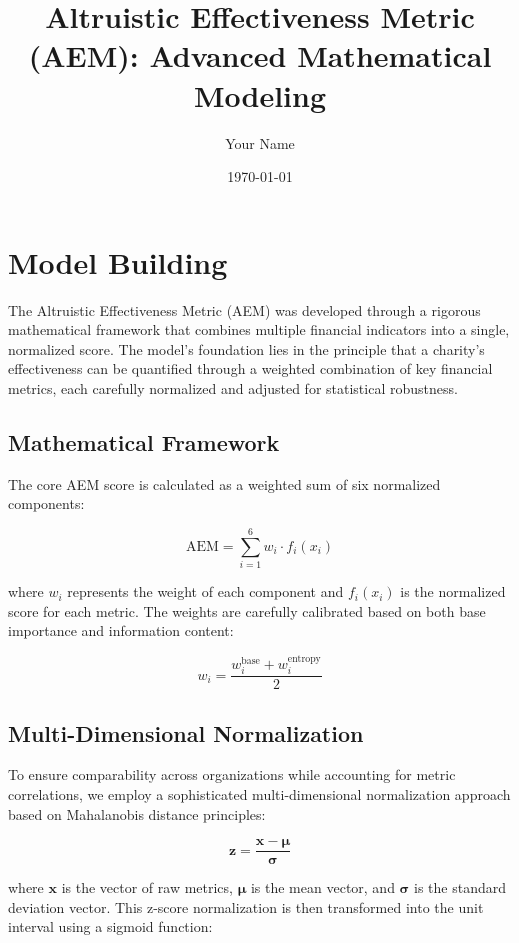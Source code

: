 \documentclass[12pt]{article}
\title{Altruistic Effectiveness Metric (AEM): Advanced Mathematical Modeling}
\author{Your Name}
\date{\today}
\begin{document}
\maketitle

\section{Model Building}

The Altruistic Effectiveness Metric (AEM) was developed through a rigorous mathematical framework that combines multiple financial indicators into a single, normalized score. The model's foundation lies in the principle that a charity's effectiveness can be quantified through a weighted combination of key financial metrics, each carefully normalized and adjusted for statistical robustness.

\subsection{Mathematical Framework}

The core AEM score is calculated as a weighted sum of six normalized components:

\begin{equation}
    \text{AEM} = \sum_{i=1}^{6} w_i \cdot f_i(x_i)
\end{equation}

where $w_i$ represents the weight of each component and $f_i(x_i)$ is the normalized score for each metric. The weights are carefully calibrated based on both base importance and information content:

\begin{equation}
    w_i = \frac{w_i^{\text{base}} + w_i^{\text{entropy}}}{2}
\end{equation}

\subsection{Multi-Dimensional Normalization}

To ensure comparability across organizations while accounting for metric correlations, we employ a sophisticated multi-dimensional normalization approach based on Mahalanobis distance principles:

\begin{equation}
    \mathbf{z} = \frac{\mathbf{x} - \mathbf{\mu}}{\mathbf{\sigma}}
\end{equation}

where $\mathbf{x}$ is the vector of raw metrics, $\mathbf{\mu}$ is the mean vector, and $\mathbf{\sigma}$ is the standard deviation vector. This z-score normalization is then transformed into the unit interval using a sigmoid function:
\end{document}
